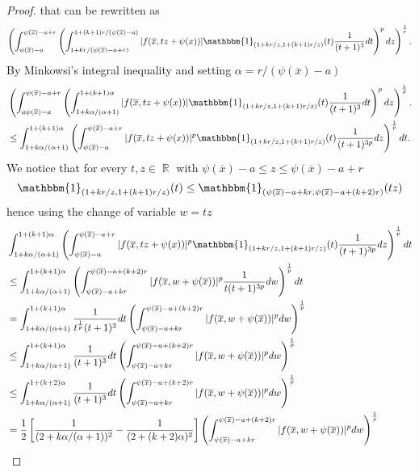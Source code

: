 \documentclass[12pt]{article}
\theoremstyle{definition}
\DeclareMathOperator\rr{\mathbb{R}}
\begin{document}
\begin{proof}
that can be rewritten as
 \[  \left( \int_{\psi(\overline x) -a}^{\psi(\overline x) -a+r}\left (\int_{1+kr/(\psi(\overline x) -a+r)}^{1+(k+1)r/(\psi(\overline x)-a)} |f(\overline x, tz+\psi(x))|\mathbbm{1}_{(1+kr/z,  1+(k+1)r/z ) }(t)\frac{1}{(t+1)^3}dt\right)^pdz \right)^{\frac{1}{p}}.\]
 By Minkowsi's integral inequality and setting $\alpha=r/(\psi(\overline x)-a)$
 \begin{align*}
  & \left( \int_{a\psi(\overline x) -a}^{\psi(\overline x) -a+r}\left (\int_{1+k\alpha/(\alpha+1)}^{1+(k+1)\alpha} |f(\overline x, tz+\psi(x))|\mathbbm{1}_{(1+kr/z,  1+(k+1)r/z ) }(t)\frac{1}{(t+1)^3}dt\right)^pdz \right)^{\frac{1}{p}}. \\
  &\le \int_{1+k\alpha/(\alpha+1)}^{1+(k+1)\alpha} \left ( \int_{\psi(\overline x) -a}^{\psi(\overline x) -a+r}|f(\overline x, tz+\psi(x))|^p\mathbbm{1}_{(1+kr/z,  1+(k+1)r/z ) }(t)\frac{1}{(t+1)^{3p}} dz \right) ^{\frac{1}{p}}dt.  
 \end{align*}
 We notice that for every $t,z \in \rr$ with $\psi(\overline x) -a \le z \le \psi(\overline x)-a+r$
 \[ \mathbbm{1}_{(1+kr/z,  1+(k+1)r/z ) }(t) \le \mathbbm{1}_{(\psi(\overline x)-a+kr, \psi(\overline x) - a+(k+2)r)}(tz)   \]
 hence using the change of variable $w=tz$
 \begin{align*}
 &\int_{1+k\alpha/(\alpha+1)}^{1+(k+1)\alpha} \left ( \int_{\psi(\overline x) -a}^{\psi(\overline x) -a+r}|f(\overline x, tz+\psi(x))|^p\mathbbm{1}_{(1+kr/z,  1+(k+1)r/z ) }(t)\frac{1}{(t+1)^{3p}} dz \right) ^{\frac{1}{p}}dt \\
&\le \int_{1+k\alpha/(\alpha+1)}^{1+(k+1)\alpha} \left ( \int_{\psi(\overline x)-a+kr}^{\psi(\overline x)-a+(k+2)r}|f(\overline x, w+\psi(\overline x))|^p \frac{1}{t(t+1)^{3p}} dw \right) ^{\frac{1}{p}}dt\\
&=\int_{1+k\alpha/(\alpha+1)}^{1+(k+1)\alpha}\frac{1}{t^{\frac{1}{p}}(t+1)^{3}}dt \left ( \int_{\psi(\overline x)-a+kr}^{\psi(\overline x)-a+(k+2)r}|f(\overline x, w+\psi(\overline x))|^p  dw \right) ^{\frac{1}{p}}\\
&\le \int_{1+k\alpha/(\alpha+1)}^{1+(k+1)\alpha}\frac{1}{(t+1)^{3}}dt \left ( \int_{\psi(\overline x)-a+kr}^{\psi(\overline x)-a+(k+2)r}|f(\overline x, w+\psi(\overline x))|^p  dw \right)^{\frac{1}{p}}\\
&\le \int_{1+k\alpha/(\alpha+1)}^{1+(k+2)\alpha}\frac{1}{(t+1)^{3}}dt \left ( \int_{\psi(\overline x)-a+kr}^{\psi(\overline x)-a+(k+2)r}|f(\overline x, w+\psi(\overline x))|^p  dw \right)^{\frac{1}{p}}\\
&= \frac{1}{2}\left[\frac{1}{(2+k\alpha/(\alpha+1))^2} -\frac{1}{(2+(k+2)\alpha)^2}\right] \left ( \int_{\psi(\overline x)-a+kr}^{\psi(\overline x)-a+(k+2)r}|f(\overline x, w+\psi(\overline x))|^p  dw \right) ^{\frac{1}{p}}\\

\end{align*}
\end{proof}
\end{document}
